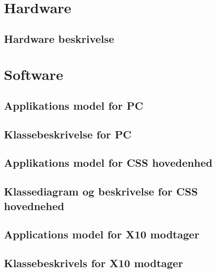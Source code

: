 \newpage
\section{Hardware}

\subsection{Hardware beskrivelse}


\newpage
\section{Software}

\subsection{Applikations model for PC}

\clearpage

\subsection{Klassebeskrivelse for PC}

\newpage

\subsection{Applikations model for CSS hovedenhed}

\clearpage

\subsection{Klassediagram og beskrivelse for CSS hovednehed}

\newpage

\newpage
\subsection{Applications model for X10 modtager}

\clearpage

\subsection{Klassebeskrivels for X10 modtager}

\newpage